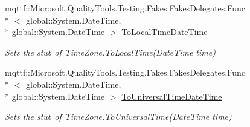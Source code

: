 \begin{DoxyCompactItemize}
mqttf\-::\-Microsoft.\-Quality\-Tools.\-Testing.\-Fakes.\-Fakes\-Delegates.\-Func\\*
$<$ global\-::\-System.\-Date\-Time, \\*
global\-::\-System.\-Date\-Time $>$ \hyperlink{class_system_1_1_fakes_1_1_stub_time_zone_ae122a654e6fb6a027093be7dd9382ec7}{To\-Local\-Time\-Date\-Time}
\begin{DoxyCompactList}\small\item\em Sets the stub of Time\-Zone.\-To\-Local\-Time(\-Date\-Time time)\end{DoxyCompactList}\item 
mqttf\-::\-Microsoft.\-Quality\-Tools.\-Testing.\-Fakes.\-Fakes\-Delegates.\-Func\\*
$<$ global\-::\-System.\-Date\-Time, \\*
global\-::\-System.\-Date\-Time $>$ \hyperlink{class_system_1_1_fakes_1_1_stub_time_zone_aba36963724489788469b76405c9b6f49}{To\-Universal\-Time\-Date\-Time}
\begin{DoxyCompactList}\small\item\em Sets the stub of Time\-Zone.\-To\-Universal\-Time(\-Date\-Time time)\end{DoxyCompactList}\end{DoxyCompactItemize}

